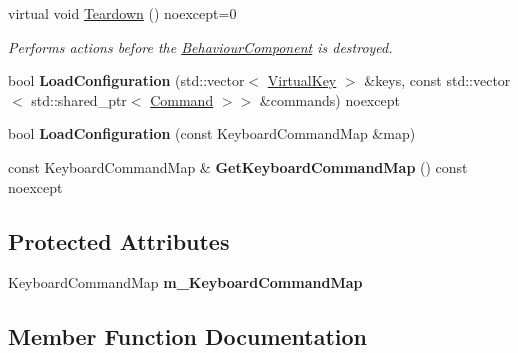 \begin{DoxyCompactItemize}
virtual void \hyperlink{class_blade_1_1_keyboard_input_component_ae62cebd0c5fa0595460275060be472f4}{Teardown} () noexcept=0
\begin{DoxyCompactList}\small\item\em Performs actions before the \hyperlink{class_blade_1_1_behaviour_component}{Behaviour\+Component} is destroyed. \end{DoxyCompactList}\item 
\mbox{\label{class_blade_1_1_keyboard_input_component_a29dccb52007e5cac972a7af8aee18902}} 
bool {\bfseries Load\+Configuration} (std\+::vector$<$ \hyperlink{namespace_blade_a15d9bde4921fb2a9a953f8d97ea49d1c}{Virtual\+Key} $>$ \&keys, const std\+::vector$<$ std\+::shared\+\_\+ptr$<$ \hyperlink{class_blade_1_1_command}{Command} $>$$>$ \&commands) noexcept
\item 
\mbox{\label{class_blade_1_1_keyboard_input_component_ac254b07f58bf9bbe4b936883e113950e}} 
bool {\bfseries Load\+Configuration} (const Keyboard\+Command\+Map \&map)
\item 
\mbox{\label{class_blade_1_1_keyboard_input_component_aae293bcde0e7af3e72e0c5d4ee2fbddc}} 
const Keyboard\+Command\+Map \& {\bfseries Get\+Keyboard\+Command\+Map} () const noexcept
\end{DoxyCompactItemize}
\subsection*{Protected Attributes}
\begin{DoxyCompactItemize}
\item 
\mbox{\label{class_blade_1_1_keyboard_input_component_a80b0217398da60a1ccc37609f3c2928d}} 
Keyboard\+Command\+Map {\bfseries m\+\_\+\+Keyboard\+Command\+Map}
\end{DoxyCompactItemize}


\subsection{Member Function Documentation}
\mbox{\label{class_blade_1_1_keyboard_input_component_a0945515e8c0513eaa5b536fd4cb2022c}} 
